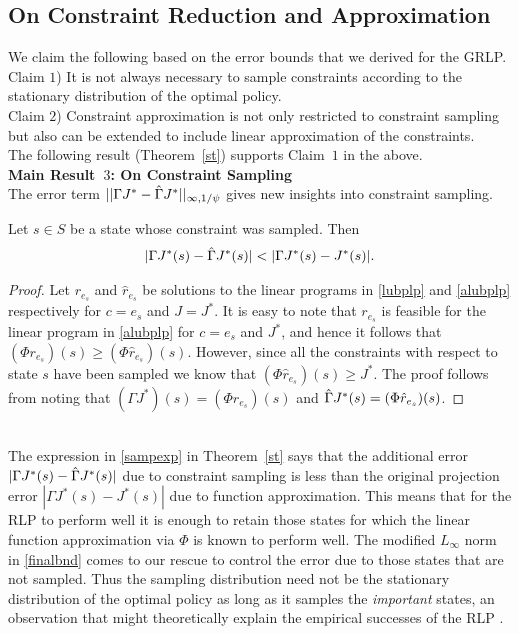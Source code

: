 \subsection{On Constraint Reduction and Approximation}
We claim the following based on the error bounds that we derived for the GRLP.\\
{Claim $1$)} It is not always necessary to sample constraints according to the stationary distribution of the optimal policy.\\
{Claim $2$)} Constraint approximation is not only restricted to constraint sampling but also can be extended to include linear approximation of the constraints.\\
The following result (Theorem~\ref{st}) supports Claim~$1$ in the above.\\
\textbf{Main Result~$3$: On Constraint Sampling}\\
The error term $||\Gamma J^*-\hat{\Gamma} J^*||_{\infty,1/\psi}$ gives new insights into constraint sampling. 
\begin{theorem}\label{st}
Let $s\in S$ be a state whose constraint was sampled. Then
\begin{align}\label{sampexp}
|\Gamma J^*(s)-\hg J^*(s)|<|\Gamma J^*(s)-J^*(s)|.
\end{align}
\end{theorem}
\begin{proof}
Let $r_{e_s}$ and $\hat{r}_{e_s}$ be solutions to the linear programs in \eqref{lubplp} and \eqref{alubplp} respectively for $c=e_s$ and $J=J^*$. It is easy to note that $r_{e_s}$ is feasible for the linear program in \eqref{alubplp} for $c=e_s$ and $J^*$, and hence it follows that $(\Phi r_{e_s})(s)\geq (\Phi \hat{r}_{e_s})(s)$. However, since all the constraints with respect to state $s$ have been sampled we know that $(\Phi \hat{r}_{e_s})(s)\geq J^*$. The proof follows from noting that $(\Gamma J^*)(s)=(\Phi r_{e_s})(s)$ and $\hat{\Gamma} J^*(s)=(\Phi \hat{r}_{e_s})(s)$.
\end{proof}\\
The expression in \eqref{sampexp} in Theorem~\ref{st} says that the additional error $|\Gamma J^*(s) -\hat{\Gamma} J^*(s)|$ due to constraint sampling is less than the original projection error $|\Gamma J^*(s)-J^*(s)|$ due to function approximation. This means that for the RLP to perform well it is enough to retain those states for which the linear function approximation via $\Phi$ is known to perform well. The modified $L_\infty$ norm in \eqref{finalbnd} comes to our rescue to control the error due to those states that are not sampled. Thus the sampling distribution need not be the stationary distribution of the optimal policy as long as it samples the \emph{important} states, an observation that might theoretically explain the empirical successes of the RLP \cite{ALP,CST,SALP}.\\
